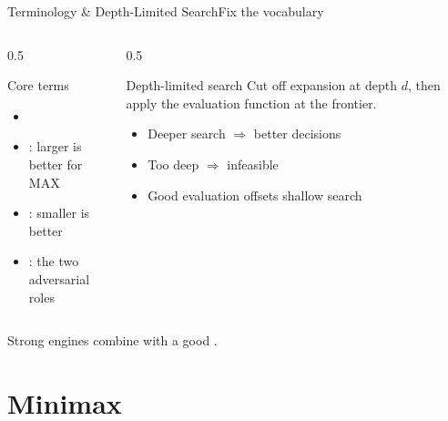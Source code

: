 \documentclass[aspectratio=169,11pt]{beamer}
\begin{document}
\begin{frame}{Terminology \& Depth-Limited Search}{Fix the vocabulary}
  \begin{columns}[T]
    \begin{column}{0.5\textwidth}
      \begin{block}{Core terms}
        \small
        \begin{itemize}
          \item {}
          \item {}: larger is better for MAX
          \item {}: smaller is better
          \item {}: the two adversarial roles
        \end{itemize}
      \end{block}
    \end{column}
    \begin{column}{0.5\textwidth}
      \begin{exampleblock}{Depth-limited search}
        \small Cut off expansion at depth $d$, then apply the evaluation function
        at the frontier.
        \begin{itemize}
          \item Deeper search $\Rightarrow$ better decisions
          \item Too deep $\Rightarrow$ infeasible
          \item Good evaluation offsets shallow search
        \end{itemize}
      \end{exampleblock}
    \end{column}
  \end{columns}
  \vspace{0.2em}
  \begin{center}\scriptsize
    Strong engines combine  with a good .
  \end{center}
\end{frame}

\section{Minimax}
\end{document}
